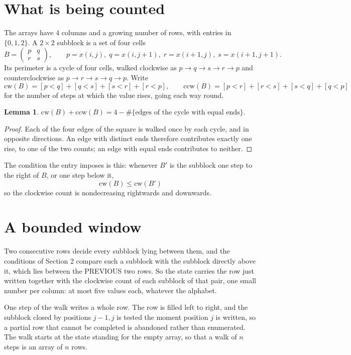 \documentclass[11pt,a4paper]{article}
\theoremstyle{plain}
\newtheorem{lemma}[theorem]{Lemma}
\theoremstyle{definition}
\begin{document}
\section{What is being counted}

The arrays have $4$ columns and a growing number of rows, with entries in $\{0,1,2\}$. A
$2\times2$ subblock is a set of four cells
\[
B=\begin{pmatrix} p & q \\ r & s \end{pmatrix},
\qquad p=x(i,j),\; q=x(i,j+1),\; r=x(i+1,j),\; s=x(i+1,j+1).
\]
Its perimeter is a cycle of four cells, walked clockwise as $p\to q\to s\to r\to p$ and
counterclockwise as $p\to r\to s\to q\to p$. Write
\[
\mathrm{cw}(B)=[p<q]+[q<s]+[s<r]+[r<p],\qquad
\mathrm{ccw}(B)=[p<r]+[r<s]+[s<q]+[q<p]
\]
for the number of steps at which the value rises, going each way round.

\begin{lemma}\label{lem:sum}
$\mathrm{cw}(B)+\mathrm{ccw}(B)=4-\#\{\text{edges of the cycle with equal ends}\}$.
\end{lemma}

\begin{proof}
Each of the four edges of the square is walked once by each cycle, and in opposite directions.
An edge with distinct ends therefore contributes exactly one rise, to one of the two counts;
an edge with equal ends contributes to neither.
\end{proof}

The condition the entry imposes is this: whenever $B'$ is the subblock one step to the right of $B$, or one step below it, 
\[
\mathrm{cw}(B)\le\mathrm{cw}(B')
\]
so the clockwise count is nondecreasing rightwards and downwards.

\section{A bounded window}

Two consecutive rows decide every subblock lying between them, and the conditions of Section 2 compare such a subblock with the subblock directly above it, which lies between the PREVIOUS two rows. So the state carries the row just written together with the clockwise count of each subblock of that pair, one small number per column: at most five values each, whatever the alphabet.

One step of the walk writes a whole row. The row is filled left to right, and the subblock
closed by positions $j-1,j$ is tested the moment position $j$ is written, so a partial row that
cannot be completed is abandoned rather than enumerated. The walk starts at the state standing
for the empty array, so that a walk of $n$ steps is an array of $n$ rows.
\end{document}
